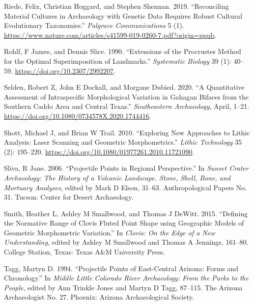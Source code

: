 \documentclass{article}
\newlength{\cslhangindent}
\newlength{\cslentryspacingunit} %
\newenvironment{CSLReferences}[2] %
 {%
  \setlength{\parindent}{0pt}
  \ifodd #1
  \let\oldpar\par
  \def\par{\hangindent=\cslhangindent\oldpar}
  \fi
  \setlength{\parskip}{#2\cslentryspacingunit}
 }%
 {}
\begin{document}
\begin{CSLReferences}{1}{0}
\leavevmode{}%
Riede, Felix, Christian Hoggard, and Stephen Shennan. 2019.
{``{Reconciling Material Cultures in Archaeology with Genetic Data
Requires Robust Cultural Evolutionary Taxonomies}.''} \emph{Palgrave
Communications} 5 (1).
\url{https://www.nature.com/articles/s41599-019-0260-7.pdf?origin=ppub}.

\leavevmode{}%
Rohlf, F James, and Dennis Slice. 1990. {``{Extensions of the Procrustes
Method for the Optimal Superimposition of Landmarks}.''}
\emph{Systematic Biology} 39 (1): 40--59.
\url{https://doi.org/10.2307/2992207}.

\leavevmode{}%
Selden, Robert Z, John E Dockall, and Morgane Dubied. 2020. {``{A
Quantitative Assessment of Intraspecific Morphological Variation in
Gahagan Bifaces from the Southern Caddo Area and Central Texas}.''}
\emph{Southeastern Archaeology}, April, 1--21.
\url{https://doi.org/10.1080/0734578X.2020.1744416}.

\leavevmode{}%
Shott, Michael J, and Brian W Trail. 2010. {``{Exploring New Approaches
to Lithic Analysis: Laser Scanning and Geometric Morphometrics}.''}
\emph{Lithic Technology} 35 (2): 195--220.
\url{https://doi.org/10.1080/01977261.2010.11721090}.

\leavevmode{}%
Sliva, R Jane. 2006. {``Projectile Points in Regional Perspective.''} In
\emph{Sunset Crater Archaeology: The History of a Volcanic Landscape.
Stone, Shell, Bone, and Mortuary Analyses}, edited by Mark D Elson,
31--63. Anthropological Papers No. 31. Tucson: Center for Desert
Archaeology.

\leavevmode{}%
Smith, Heather L, Ashley M Smallwood, and Thomas J DeWitt. 2015.
{``{Defining the Normative Range of Clovis Fluted Point Shape using
Geographic Models of Geometric Morphometric Variation}.''} In
\emph{{Clovis: On the Edge of a New Understanding}}, edited by Ashley M
Smallwood and Thomas A Jennings, 161--80. College Station, Texas: Texas
A\&M University Press.

\leavevmode{}%
Tagg, Martyn D. 1994. {``{Projectile Points of East-Central Arizona:
Forms and Chronology}.''} In \emph{{Middle Little Colorado River
Archaeology: From the Parks to the People}}, edited by Ann Trinkle Jones
and Martyn D Tagg, 87--115. The Arizona Archaeologist No. 27. Phoenix:
Arizona Archaeological Society.


\end{CSLReferences}
\end{document}
